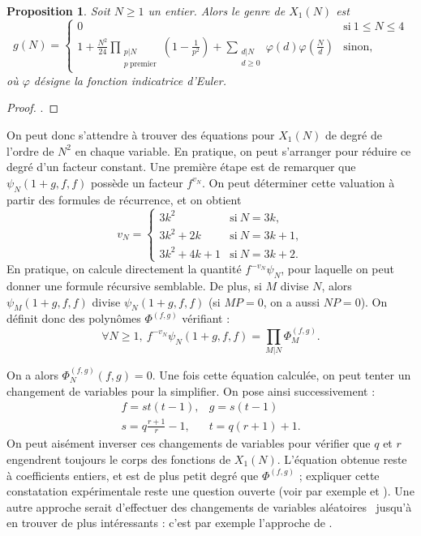 \documentclass[11pt,a4paper]{article}
\newtheorem*{prop}{Proposition}
\theoremstyle{definition}
\begin{document}
\begin{prop}
Soit $N\geq 1$ un entier. Alors le genre de $X_1(N)$ est 
$$  g(N) = 
\begin{cases}
0 &\text{si}\ 1\leq N\leq 4 \\
\displaystyle 1 + \frac{N^2}{24} \prod_{\substack{p|N \\ p\ \mathrm{premier}}} \left(1 - \frac{1}{p^2}\right) + \sum_{\substack{d|N\\ d\geq 0}} \varphi(d)\varphi\left(\frac{N}{d}\right)& \text{sinon,}
\end{cases}$$
où $\varphi$ désigne la fonction indicatrice d'Euler.
\end{prop}

\begin{proof}
\cite{Coreens}.
\end{proof}

On peut donc s'attendre à trouver des équations pour $X_1(N)$ de degré de l'ordre de $N^2$ en chaque variable. En pratique, on peut s'arranger pour réduire ce degré d'un facteur constant. Une première étape est de remarquer que $\psi_N(1+g, f, f)$ possède un facteur $f^{v_N}.$ On peut déterminer cette valuation à partir des formules de récurrence, et on obtient
$$ v_N =
\begin{cases}
3k^2 & \text{si}\ N = 3k, \\
3k^2 + 2k &\text{si}\ N = 3k+1, \\
3k^2 + 4k + 1 &\text{si}\ N = 3k+2.
\end{cases}$$
En pratique, on calcule directement la quantité $f^{-v_N}\psi_N$, pour laquelle on peut donner une formule récursive semblable. De plus, si $M$ divise $N$, alors $\psi_M(1+g, f, f)$ divise $\psi_N(1+g, f, f)$ (si $MP = 0$, on a aussi $NP = 0$). On définit donc des polynômes $\Phi^{(f, g)}$ vérifiant :
$$\forall N\geq 1,\ f^{-v_N} \psi_N(1+g, f, f) = \prod_{M | N} \Phi_M^{(f, g)}.$$

On a alors $\Phi_N^{(f, g)}(f, g) = 0$. Une fois cette équation calculée, on peut tenter  un changement de variables pour la simplifier. On pose ainsi successivement :
$$\begin{matrix} f = st(t-1), & g = s(t-1)\\
 s = q\frac{r+1}{r} - 1, & t = q(r+1) + 1.
 \end{matrix}$$
On peut aisément inverser ces changements de variables pour vérifier que $q$ et $r$ engendrent toujours le corps des fonctions de $X_1(N)$. L'équation obtenue reste à coefficients entiers, et est de plus petit degré que $\Phi^{(f, g)}$ ; expliquer cette constatation expérimentale reste une question ouverte (voir par exemple \cite{Galbraith} et \cite{Baaziz}). Une autre approche serait d'effectuer des changements de variables \og aléatoires \fg\ jusqu'à en trouver de plus intéressants : c'est par exemple l'approche de \cite{Sutheq}.
\end{document}
